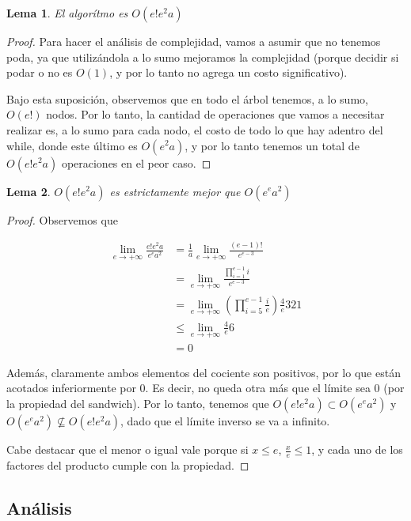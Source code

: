 \documentclass{article}
\newtheorem{lemma}{Lema}[theorem]
\theoremstyle{definition}
\theoremstyle{remark}
\begin{document}
\begin{lemma}
El algorítmo es $O(e! e^2 a)$
\end{lemma}

\begin{proof}
Para hacer el análisis de complejidad, vamos a asumir que no tenemos poda, ya que utilizándola a lo sumo mejoramos la complejidad (porque decidir si podar o no es $O(1)$, y por lo tanto no agrega un costo significativo).

Bajo esta suposición, observemos que en todo el árbol tenemos, a lo sumo, $O(e!)$ nodos. Por lo tanto, la cantidad de operaciones que vamos a necesitar realizar es, a lo sumo para cada nodo, el costo de todo lo que hay adentro del while, donde este último es $O(e^2 a)$, y por lo tanto tenemos un total de $O(e! e^2 a)$ operaciones en el peor caso.
\end{proof}

\begin{lemma}
$O(e! e^2 a)$ es estrictamente mejor que $O(e^e a^2)$
\end{lemma}

\begin{proof}
Observemos que

\begin{equation}
\begin{aligned}
\lim_{e \to +\infty} \frac{e! e^2 a}{e^e a^2} &= \frac{1}{a} \lim_{e \to +\infty} \frac{(e-1)!}{e^{e-3}} \\
&= \lim_{e \to +\infty} \frac{\prod_{i=1}^{e-1} i}{e^{e-3}} \\
&= \lim_{e \to +\infty} (\prod_{i=5}^{e-1} \frac{i}{e}) \frac{4}{e} 3 2 1 \\
&\leq \lim_{e \to +\infty} \frac{4}{e} 6 \\
&= 0
\end{aligned}
\end{equation}

Además, claramente ambos elementos del cociente son positivos, por lo que están acotados inferiormente por 0. Es decir, no queda otra más que el límite sea 0 (por la propiedad del sandwich). Por lo tanto, tenemos que $O(e! e^2 a) \subset O(e^e a^2)$ y $O(e^e a^2) \nsubseteq O(e! e^2 a)$, dado que el límite inverso se va a infinito.

Cabe destacar que el menor o igual vale porque si $x \leq e$, $\frac{x}{e} \leq 1$, y cada uno de los factores del producto cumple con la propiedad.
\end{proof}

\subsection{Análisis}
\end{document}
